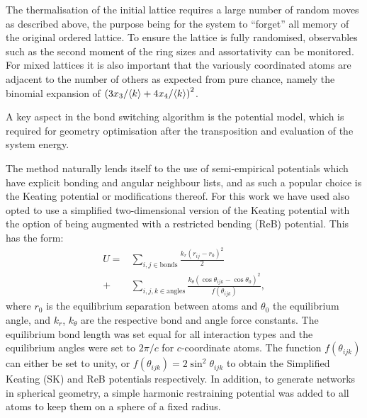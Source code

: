 The thermalisation of the initial lattice requires a large number of random moves as described above, the purpose being for the system to ``forget'' all memory of the original ordered lattice. 
To ensure the lattice is fully randomised, observables such as the second moment of the ring sizes and assortativity can be monitored. For mixed lattices it is also important that the variously coordinated atoms are adjacent to the number of others as expected from pure chance, namely the binomial expansion of $\left(3x_3/\langle k \rangle+4x_4/\langle k \rangle\right)^2$.

A key aspect in the bond switching algorithm is the potential model, which is required for geometry optimisation after the transposition and evaluation of the system energy. 


The method naturally lends itself to the use of semi-empirical potentials which have explicit bonding and angular neighbour lists, and as such a popular choice is the Keating potential\cite{Keating1966,Barkema2000} or modifications thereof\cite{Jain2018}.
For this work we have used also opted to use a simplified two\--dimensional version of the Keating potential\cite{VonAlfthan2003} with the option of being augmented with a restricted bending (ReB) potential\cite{Bulacu2013}.
This has the form:
\begin{align}
        U = &\sum_{i,j \in \text{bonds}} \frac{k_r\left(r_{ij}-r_0\right)^2}{2} \\ \nonumber
         + &\sum_{i,j,k \in \text{angles}} \frac{k_\theta \left(\cos \theta_{ijk} - \cos \theta_0\right)^2}{f\left(\theta_{ijk}\right)},
\end{align}
where $r_0$ is the equilibrium separation between atoms and $\theta_0$ the equilibrium angle, and $k_r$, $k_\theta$ are the respective bond and angle force constants.
The equilibrium bond length was set equal for all interaction types and the equilibrium angles were set to $2\pi/c$ for $c$-coordinate atoms.
The function $f\left(\theta_{ijk}\right)$ can either be set to unity, or $f\left(\theta_{ijk}\right)=2\sin^2\theta_{ijk}$ to obtain the Simplified Keating (SK) and ReB potentials respectively.
In addition, to generate networks in spherical geometry, a simple harmonic restraining potential was added to all atoms to keep them on a sphere of a fixed radius.

